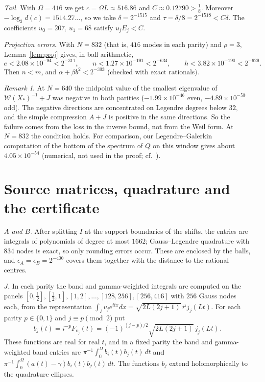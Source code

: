 \documentclass[11pt]{amsart}
\theoremstyle{remark}
\newtheorem{remark}[proposition]{Remark}
\numberwithin{equation}{section}
\begin{document}
\emph{Tail.} With $\Omega=416$ we get $c=\Omega L\approx516.86$ and $C\approx0.12790>\frac18$. Moreover $-\log_2d(c)=1514.27\ldots$, so we take $\delta=2^{-1515}$ and $\tau=\delta/8=2^{-1518}<C\delta$. The coefficients $u_0=207$, $u_1=68$ satisfy $u_jE_j<C$.

\emph{Projection errors.} With $N=832$ (that is, $416$ modes in each parity) and $\rho=3$, Lemma~\ref{lem:proj} gives, in ball arithmetic,
\[
e<2.08\times10^{-94}<2^{-311},\qquad n<1.27\times10^{-191}<2^{-634},\qquad h<3.82\times10^{-190}<2^{-629} .
\]
Then $n<m$, and $\alpha+\beta b^2<2^{-303}$ (checked with exact rationals).

\begin{remark}
At $N=640$ the midpoint value of the smallest eigenvalue of $\mathcal W(X_*)^{-1}+J$ was negative in both parities ($-1.99\times10^{-46}$ even, $-4.89\times10^{-50}$ odd). The negative directions are concentrated on Legendre degrees below $32$, and the simple compression $A+J$ is positive in the same directions. So the failure comes from the loss in the inverse bound, not from the Weil form. At $N=832$ the condition holds. For comparison, our Legendre--Galerkin computation of the bottom of the spectrum of $Q$ on this window gives about $4.05\times10^{-54}$ (numerical, not used in the proof; cf.\ \cite{MoriWeilV}).
\end{remark}

\section{Source matrices, quadrature and the certificate}\label{sec:certificate}

\emph{$A$ and $B$.} After splitting $I$ at the support boundaries of the shifts, the entries are integrals of polynomials of degree at most $1662$; Gauss--Legendre quadrature with $834$ nodes is exact, so only rounding errors occur. These are enclosed by the balls, and $\epsilon_A=\epsilon_B=2^{-400}$ covers them together with the distance to the rational centres.

\emph{$J$.} In each parity the band and gamma-weighted integrals are computed on the panels $[0,\frac12],[\frac12,1],[1,2],\dots,[128,256],[256,416]$ with $256$ Gauss nodes each, from the representation $\int_Iv_je^{itx}dx=\sqrt{2L(2j+1)}\,i^jj_j(Lt)$. For each parity $p\in\{0,1\}$ and $j\equiv p\pmod2$ put
\[
b_j(t)=i^{-p}F_{v_j}(t)=(-1)^{(j-p)/2}\sqrt{2L(2j+1)}\,j_j(Lt).
\]
These functions are real for real $t$, and in a fixed parity the band and gamma-weighted band entries are $\pi^{-1}\int_0^\Omega b_i(t)b_j(t)\,dt$ and $\pi^{-1}\int_0^\Omega(a(t)-\gamma)b_i(t)b_j(t)\,dt$. The functions $b_j$ extend holomorphically to the quadrature ellipses.
\end{document}
